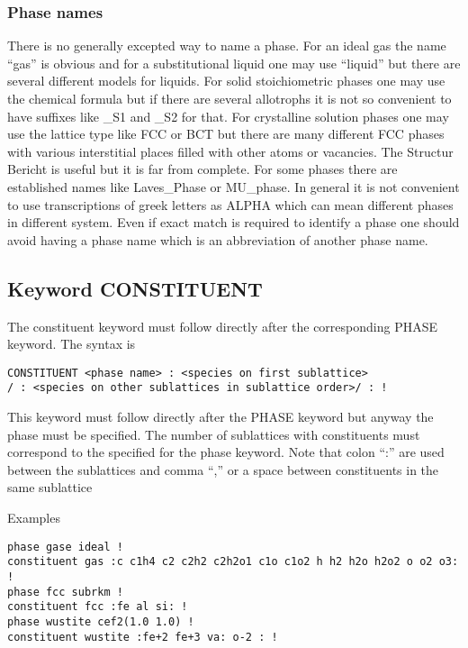 \documentclass[12pt]{article}
\begin{document}
\subsubsection{Phase names}\label{sec:phnames}

There is no generally excepted way to name a phase.  For an ideal gas
the name ``gas'' is obvious and for a substitutional liquid one may
use ``liquid'' but there are several different models for liquids.
For solid stoichiometric phases one may use the chemical formula but
if there are several allotrophs it is not so convenient to have
suffixes like \_S1 and \_S2 for that.  For crystalline solution phases
one may use the lattice type like FCC or BCT but there are many
different FCC phases with various interstitial places filled with
other atoms or vacancies.  The Structur Bericht is useful but it is
far from complete.  For some phases there are established names like
Laves\_Phase or MU\_phase.  In general it is not convenient to use
transcriptions of greek letters as ALPHA which can mean different
phases in different system.  Even if exact match is required to identify
a phase one should avoid having a phase name which is an abbreviation
of another phase name.


\subsection{Keyword CONSTITUENT}\label{sec:const}

The constituent keyword must follow directly after the corresponding
PHASE keyword.  The syntax is

\begin{verbatim}
CONSTITUENT <phase name> : <species on first sublattice> 
/ : <species on other sublattices in sublattice order>/ : !
\end{verbatim}

This keyword must follow directly after the PHASE keyword but anyway
the phase must be specified.  The number of sublattices with
constituents must correspond to the specified for the phase keyword.
Note that colon ``:'' are used between the sublattices and comma ``,''
or a space between constituents in the same sublattice

Examples

\begin{verbatim}
phase gase ideal !
constituent gas :c c1h4 c2 c2h2 c2h2o1 c1o c1o2 h h2 h2o h2o2 o o2 o3: !
phase fcc subrkm !
constituent fcc :fe al si: !
phase wustite cef2(1.0 1.0) !
constituent wustite :fe+2 fe+3 va: o-2 : !
\end{verbatim}
\end{document}
